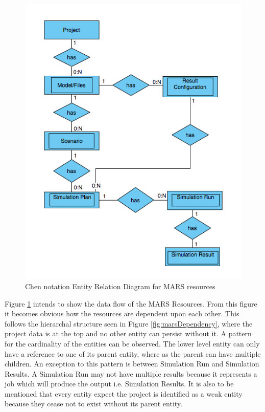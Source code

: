         \begin{figure}[H]
            \centering \includegraphics[scale=0.6]{grafiken/ERMars.png}
            \caption{Chen notation Entity Relation Diagram for MARS resources}
            \label{fig:ERMars}
        \end{figure}
        
        Figure \ref{fig:ERMars} intends to show the data flow of the MARS Resources. From this figure it becomes obvious 
        how the resources are dependent upon each other. This follows the hierarchal structure seen in Figure \ref{fig:marsDependency},
        where the project data is at the top and no other entity can persist without it. A pattern for the cardinality of the entities can be observed.
        The lower level entity can only have a reference to one of its parent entity, where as the parent can have multiple children. An exception to this
        pattern is between Simulation Run and Simulation Results. A Simulation Run may not have multiple results because it represents a job which will produce
        the output i.e. Simulation Results. It is also to be mentioned that every entity expect the project is identified as a weak entity because they cease not 
        to exist without its parent entity. 

